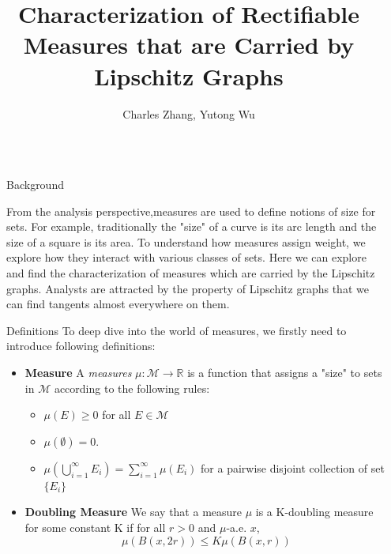 \documentclass[final]{beamer}
\title{Characterization of Rectifiable Measures that are Carried by Lipschitz Graphs}
\author{Charles Zhang, Yutong Wu}
\institute[shortinst]{Mathematics, Statistics, and Computer Science Department, Macalester College}
\newlength{\sepwidth}
\newlength{\colwidth}
\newcommand{\separatorcolumn}{\begin{column}{\sepwidth}\end{column}}
\begin{document}
\begin{frame}[t]
\begin{columns}[t]
\separatorcolumn

\begin{column}{\colwidth}

  \begin{block}{Background}

  From the analysis perspective,measures are used to define notions of size for sets. For example, traditionally the "size" of a curve is its arc length and the size of a square is its area. To understand how measures assign weight, we explore how they interact with various classes of sets. Here we can explore and find the characterization of measures which are carried by the Lipschitz graphs. Analysts are attracted by the property of Lipschitz graphs that we can find tangents almost everywhere on them.

  \end{block}

  \begin{block}{Definitions}
    To deep dive into the world of measures, we firstly need to introduce following definitions:\\
    \begin{itemize}
      \item \textbf{Measure} A \textit{measures} $\mu:\mathcal{M}\rightarrow\mathbb{R}$ is a function that assigns a "size" to sets in $\mathcal{M}$ according to the following rules:
	\begin{itemize}
		\item $\mu(E)\ge 0$ for all $E\in\mathcal{M}$ 
		\item $\mu(\emptyset)=0$.
		\item $\mu\left(\bigcup_{i=1}^\infty E_i\right)=\sum_{i=1}^\infty \mu(E_i)$ for a pairwise disjoint collection of set $\{E_i\}$
	\end{itemize}
	
	    \item  \textbf{Doubling Measure} We say that a measure $\mu$ is a K-doubling measure for some constant K if for all $r>0$ and $\mu$-a.e. $x$, 
   \begin{equation*}
       \mu(B(x, 2r))\leq K\mu(B(x,r))
   \end{equation*}
   

\end{itemize}
\end{block}
\end{column}
\end{columns}
\end{frame}
\end{document}
